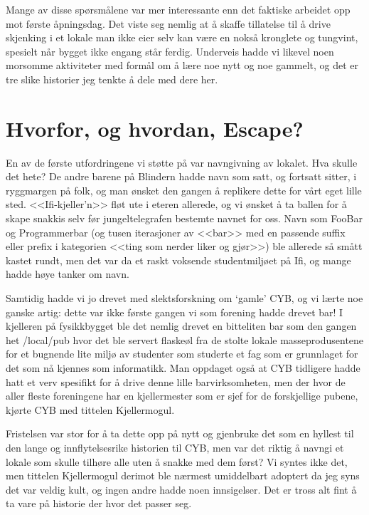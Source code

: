 Mange av disse spørsmålene var mer interessante enn det faktiske arbeidet opp mot første åpningsdag. Det viste seg nemlig at å skaffe tillatelse til å drive skjenking i et lokale man ikke eier selv kan være en nokså kronglete og tungvint, spesielt når bygget ikke engang står ferdig. Underveis hadde vi likevel noen morsomme aktiviteter med formål om å lære noe nytt og noe gammelt, og det er tre slike historier jeg tenkte å dele med dere her.

\section{Hvorfor, og hvordan, Escape?}

En av de første utfordringene vi støtte på var navngivning av lokalet. Hva skulle det hete? De andre barene på Blindern hadde navn som satt, og fortsatt sitter, i ryggmargen på folk, og man ønsket den gangen å replikere dette for vårt eget lille sted. <<Ifi-kjeller'n>> fløt ute i eteren allerede, og vi ønsket å ta ballen for å skape snakkis selv før jungeltelegrafen bestemte navnet for oss. Navn som FooBar og Programmerbar (og tusen iterasjoner av <<bar>> med en passende suffix eller prefix i kategorien <<ting som nerder liker og gjør>>) ble allerede så smått kastet rundt, men det var da et raskt voksende studentmiljøet på Ifi, og mange hadde høye tanker om navn.

Samtidig hadde vi jo drevet med slektsforskning om `gamle' CYB, og vi lærte noe ganske artig: dette var ikke første gangen vi som forening hadde drevet bar! I kjelleren på fysikkbygget ble det nemlig drevet en bitteliten bar som den gangen het /local/pub hvor det ble servert flaskeøl fra de stolte lokale masseprodusentene for et bugnende lite miljø av studenter som studerte et fag som er grunnlaget for det som nå kjennes som informatikk. Man oppdaget også at CYB tidligere hadde hatt et verv spesifikt for å drive denne lille barvirksomheten, men der hvor de aller fleste foreningene har en kjellermester som er sjef for de forskjellige pubene, kjørte CYB med tittelen Kjellermogul.

Fristelsen var stor for å ta dette opp på nytt og gjenbruke det som en hyllest til den lange og innflytelsesrike historien til CYB, men var det riktig å navngi et lokale som skulle tilhøre alle uten å snakke med dem først? Vi syntes ikke det, men tittelen Kjellermogul derimot ble nærmest umiddelbart adoptert da jeg syns det var veldig kult, og ingen andre hadde noen innsigelser. Det er tross alt fint å ta vare på historie der hvor det passer seg.

